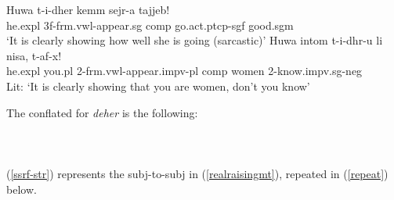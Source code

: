 \documentclass[output=paper]{LSP/langsci}
\begin{document}
\ea \label{huwanonsubjfunction}
\ea
\gll Huwa t-i-dher kemm sejr-a tajjeb!\\
he.{\sc expl} 3{\sc f}-{\sc frm.vwl}-appear.{\sc sg} {\sc comp} go.{\sc act.ptcp-sgf} good.{\sc sgm}\\
\glt `It is clearly showing how well she is going (sarcastic)'
\ex
\gll Huwa intom t-i-dhr-u li nisa, t-af-x!\\
he.{\sc expl} you.{\sc pl} 2-{\sc frm.vwl}-appear.{\sc impv-pl} {\sc comp} women 2-know.{\sc impv.sg-neg}\\
\glt Lit: `It is clearly showing that you are women, don't you know'
\z
\z 

The conflated  for \emph{deher} is the following:\\
\\
\\
\\
(\ref{ssrf-str}) represents the {\sc subj}-to-{\sc subj}  in (\ref{realraisingmt}), repeated in (\ref{repeat}) below.
\end{document}

